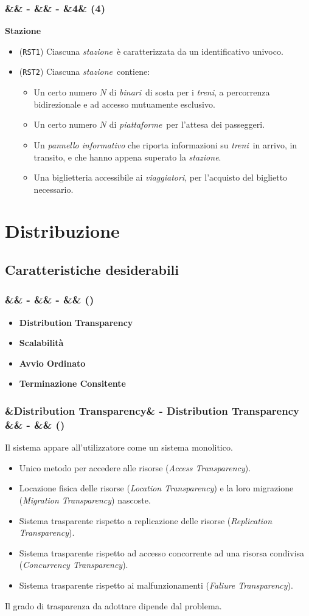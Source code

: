 \documentclass[slidestop,compress,blackandwhite]{beamer}
\newcommand{\itemB}[3]{
	\item \textbf{#1} #2 \vspace{#3}
}
\newcommand{\ttt}[1]{\texttt{#1}}
\newcommand{\ii}[1]{\textit{#1}}
\newcommand{\treni}{\ii{treni}}
\newcommand{\viaggiatori}{\ii{viaggiatori}}
\newcommand{\stazione}{\ii{stazione}}
\newcommand{\piattaforme}{\ii{piattaforme}}
\newcommand{\binari}{\ii{binari}}
\newcommand{\newtitle}[4]{
	#1 
	\ifx&#2&%
	\else
  		\large- #2
	\fi
	\ifx&#3&%
	\else
  		\normalsize- #3
	\fi
	\ifx&#4&%
	\else
  		\normalsize (#4)
	\fi
}
\newcommand{\newframe}[5]{
	\begin{frame}
		\frametitle{\newtitle{#1}{#2}{#3}{#4}}
		#5
	\end{frame}
}
\newcommand{\itemt}[1]{\item (\ttt{#1})}
\begin{document}
	\newframe{}{}{}{4}{
		\vspace{0.5cm}
		\textbf{Stazione}
		\begin{itemize}
			\itemt{RST1} Ciascuna \stazione~è caratterizzata da un identificativo univoco.
			\itemt{RST2} Ciascuna \stazione~contiene:
				\begin{itemize}
					\item Un certo numero $N$ di \binari~di sosta per i \treni, a percorrenza bidirezionale e ad accesso mutuamente esclusivo.
					\item Un certo numero $N$ di \piattaforme~per l'attesa dei passeggeri.
					\item Un \ii{pannello informativo} che riporta informazioni su \treni~in arrivo, in transito, e che hanno appena superato la \stazione.
					\item Una biglietteria accessibile ai \viaggiatori, per l'acquisto del biglietto necessario.
				\end{itemize}
		\end{itemize} 
	}


	\section{Distribuzione}
	
	\subsection{Caratteristiche desiderabili}\label{characteristics}
	\newframe{}{}{}{}{
		\begin{itemize}
			\itemB{Distribution Transparency}{}{1cm}
			\itemB{Scalabilità}{}{1cm} 
			\itemB{Avvio Ordinato}{}{1cm} 
			\itemB{Terminazione Consitente}{}{1cm} 
		\end{itemize}
	}
	
		
	\newframe{}{Distribution Transparency}{}{}{
		
		Il sistema appare all'utilizzatore come un sistema monolitico.
		\begin{itemize}
			\item Unico metodo per accedere alle risorse (\ii{Access Transparency}).
			\item Locazione fisica delle risorse (\ii{Location Transparency}) e la loro migrazione (\ii{Migration Transparency}) nascoste.
			\item Sistema trasparente rispetto a replicazione delle risorse (\ii{Replication Transparency}).
			\item Sistema trasparente rispetto ad accesso concorrente ad una risorsa condivisa (\ii{Concurrency Transparency}).
			\item Sistema trasparente rispetto ai malfunzionamenti (\ii{Faliure Transparency}).
		\end{itemize}
		
		Il grado di trasparenza da adottare dipende dal problema.
	}
	
\end{document}
